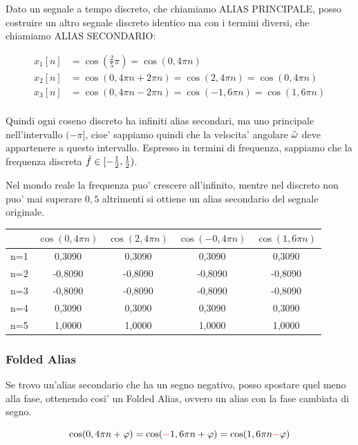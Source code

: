 Dato un segnale a tempo discreto, che chiamiamo ALIAS PRINCIPALE, posso costruire un altro segnale discreto identico ma con i termini diversi, che chiamiamo ALIAS SECONDARIO:

\[\begin{split}
    x_1[n] &= \cos(\frac{2}{5} \pi) = \cos(0,4 \pi n) \\
    x_2[n] &= \cos(0,4 \pi n + 2\pi n) = \cos(2,4 \pi n) =  \cos(0,4 \pi n) \\
    x_3[n] &= \cos(0,4 \pi n - 2\pi n) = \cos(-1,6 \pi n) =  \cos(1,6 \pi n) \\
\end{split}\]

Quindi ogni coseno discreto ha infiniti alias secondari, ma uno principale nell'intervallo $(-\pi]$, cioe' sappiamo quindi che la velocita' angolare $\Tilde{\omega}$ deve appartenere a questo intervallo. Espresso in termini di frequenza, sappiamo che la frequenza discreta $\Tilde{f} \in [-\frac{1}{2}, \frac{1}{2})$.

Nel mondo reale la frequenza puo' crescere all'infinito, mentre nel discreto non puo' mai superare $0,5$ altrimenti si ottiene un alias secondario del segnale originale.

\begin{table}[ht!]
    \centering
    \begin{tabular}{c|c|c|c|c}
         & $\cos(0,4 \pi n)$ & $\cos(2,4 \pi n)$ & $\cos(-0,4 \pi n)$ & $\cos(1,6 \pi n)$ \\
         \hline
        n=1 & 0,3090 & 0,3090 & 0,3090 & 0,3090 \\
        n=2 & -0,8090 & -0,8090 & -0,8090 & -0,8090 \\
        n=3 & -0,8090 & -0,8090 & -0,8090 & -0,8090 \\
        n=4 & 0,3090 & 0,3090 & 0,3090 & 0,3090 \\
        n=5 & 1,0000 & 1,0000 & 1,0000 & 1,0000 \\
    \end{tabular}
\end{table}

\subsubsection{Folded Alias}
Se trovo un'alias secondario che ha un segno negativo, posso spostare quel meno alla fase, ottenendo cosi' un Folded Alias, ovvero un alias con la fase cambiata di segno.

\[
    \cos(0,4 \pi n + \varphi) = \cos(\textcolor{red}{-}  1,6 \pi n + \varphi) = \cos(1,6 \pi n \textcolor{red}{-} \varphi)
\]

